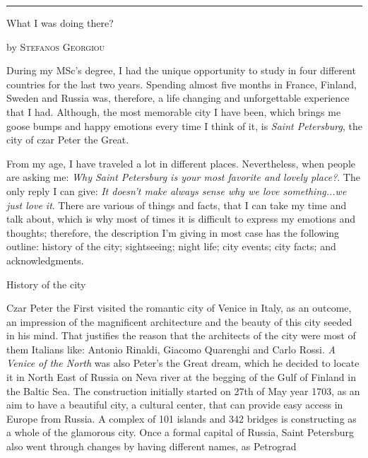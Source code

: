 \documentclass[10pt,a4paper]{article} %
\newcommand{\SepRule}{\noindent	%
\begin{center}
\rule{250pt}{1pt} %
\end{center}
}
\newcommand{\NewsItem}[1]{ %
\usefont{T1}{fvs}{n}{n} %
\vspace{24pt}\large #1\vspace{3pt} %
\par \normalsize \normalfont}
\newcommand{\NewsAuthor}[1]{ %
\hfill by \textsc{#1} \vspace{20pt} %
\par \normalfont}
\begin{document}
\vspace{0.5cm}
\SepRule %
\vspace{0.5cm}

\begin{multicols}{3} %


\NewsItem{What I was doing there?}
\NewsAuthor{Stefanos Georgiou}

During my MSc's degree, I had the unique opportunity to study 
in four different countries for the last two years. 
Spending almost five months in France, Finland, Sweden and Russia was, 
therefore, a life changing and unforgettable experience that I had. 
Although, the most memorable city I have been, 
which brings me goose bumps and happy emotions every time I think of it, 
is \textit{Saint Petersburg}, the city of czar Peter the Great.

From my age, I have traveled a lot in different places. 
Nevertheless, when people are asking me: 
\textit{Why Saint Petersburg is your most favorite and lovely place?}. 
The only reply I can give: \textit{It doesn't make always sense why we love something...we just love it}. 
There are various of things and facts, that I can take my time and talk about, 
which is why most of times it is difficult to express my emotions and thoughts; 
therefore, the description I'm giving in most case has the following outline:
history of the city; sightseeing; night life; city events; city facts; 
and acknowledgments.

\NewsItem{History of the city}

Czar Peter the First visited the romantic city of Venice in Italy, as an outcome, 
an impression of the magnificent architecture and the beauty of this city 
seeded in his mind. 
That justifies the reason that the architects of the city were most of them Italians 
like: Antonio Rinaldi, Giacomo Quarenghi and Carlo Rossi. 
\textit{A Venice of the North} was also Peter's the Great dream, 
which he decided to locate it in North East of Russia on Neva river 
at the begging of the Gulf of Finland in the Baltic Sea. 
The construction initially started on 27th of May year 1703, 
as an aim to have a beautiful city, a cultural center, 
that can provide easy access in Europe from Russia. 
A complex of 101 islands and 342 bridges is constructing as a whole of the glamorous city. 
Once a formal capital of Russia, Saint Petersburg also went through 
changes by having different names, as Petrograd 


\end{multicols} %
\end{document}
